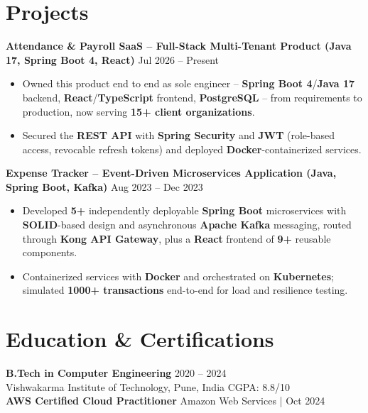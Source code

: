 \documentclass[a4paper,10pt]{article}
\begin{document}
\section*{Projects}

\textbf{Attendance \& Payroll SaaS -- Full-Stack Multi-Tenant Product (Java 17, Spring Boot 4, React)} \hfill Jul 2026 -- Present
\begin{itemize}[leftmargin=*]
    \item Owned this product end to end as sole engineer -- \textbf{Spring Boot 4}/\textbf{Java 17} backend, \textbf{React}/\textbf{TypeScript} frontend, \textbf{PostgreSQL} -- from requirements to production, now serving \textbf{15+ client organizations}.
    \item Secured the \textbf{REST API} with \textbf{Spring Security} and \textbf{JWT} (role-based access, revocable refresh tokens) and deployed \textbf{Docker}-containerized services.
\end{itemize}

\textbf{Expense Tracker -- Event-Driven Microservices Application (Java, Spring Boot, Kafka)} \hfill Aug 2023 -- Dec 2023
\begin{itemize}[leftmargin=*]
    \item Developed \textbf{5+} independently deployable \textbf{Spring Boot} microservices with \textbf{SOLID}-based design and asynchronous \textbf{Apache Kafka} messaging, routed through \textbf{Kong API Gateway}, plus a \textbf{React} frontend of \textbf{9+} reusable components.
    \item Containerized services with \textbf{Docker} and orchestrated on \textbf{Kubernetes}; simulated \textbf{1000+ transactions} end-to-end for load and resilience testing.
\end{itemize}

\section*{Education \& Certifications}
\textbf{B.Tech in Computer Engineering} \hfill 2020 -- 2024 \\
Vishwakarma Institute of Technology, Pune, India \hfill CGPA: 8.8/10 \\
\textbf{AWS Certified Cloud Practitioner} \hfill Amazon Web Services \;|\; Oct 2024
\end{document}
